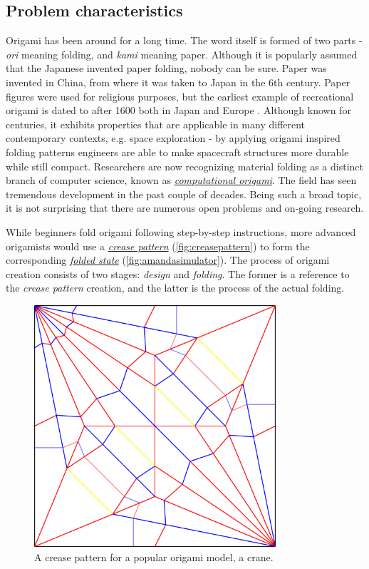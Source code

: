 \subsection{Problem characteristics}
Origami has been around for a long time. 
The word itself is formed of two parts - \textit{ori} meaning folding, and \textit{kami} meaning paper. 
Although it is popularly assumed that the Japanese invented paper folding, nobody can be sure.
Paper was invented in China, from where it was taken to Japan in the 6th century.
Paper figures were used for religious purposes, but the earliest example of recreational origami 
is dated to after 1600 both in Japan and Europe \cite{origami-bible}.
Although known for centuries, it exhibits properties that are applicable 
in many different contemporary contexts, e.g.
space exploration \cite{origami-in-orbit} \cite{solar-panel-origami} - by applying origami inspired folding patterns
engineers are able to make spacecraft structures more durable while still compact.
Researchers are now recognizing material folding as a distinct
branch of computer science, known as \hyperref[dictionary:computational-origami]{\textit{computational origami}}.
The field has seen tremendous development in the past couple of decades.
Being such a broad topic, it is not surprising that there are numerous open problems \cite{mit-open-problems} and on-going research.


While beginners fold origami following step-by-step instructions,
more advanced origamists would use a \hyperref[dictionary:crease-pattern]{\textit{crease pattern}} (\autoref{fig:creasepattern})
to form the corresponding \hyperref[dictionary:folded-state]{\textit{folded state}} (\autoref{fig:amandasimulator}).
The process of origami creation consists of two stages: \textit{design} and \textit{folding}.
The former is a reference to the \textit{crease pattern} creation, and the latter is the process of the actual folding.

\begin{figure}[H]
\caption{A crease pattern for a popular origami model, a crane.\label{fig:creasepattern}}
  \centering
    \includegraphics[width=0.8\textwidth]{assets/crane-crease-pattern.png}
\end{figure}

